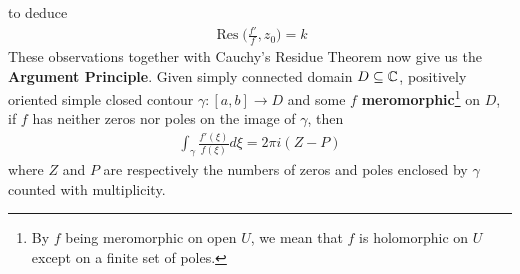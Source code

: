 \documentclass{report}
\begin{document}
to deduce 
\begin{align*}
\operatorname{Res}\Big(\frac{f'}{f},z_0 \Big)=k
\end{align*}
These observations together with Cauchy's Residue Theorem now give us the \textbf{Argument Principle}. Given simply connected domain $D\subseteq \mathbb{C}$, positively oriented simple closed contour $\gamma :[a,b]\rightarrow D$ and some $f$ \textbf{meromorphic}\footnote{By $f$ being meromorphic on open $U$, we mean that $f$ is holomorphic on $U$ except on a finite set of poles.} on $D$, if $f$ has neither zeros nor poles on the image of $\gamma $, then   
\begin{align*}
\int_{\gamma } \frac{f'(\xi)}{f(\xi)}d\xi = 2\pi  i (Z-P)
\end{align*}
where $Z$ and $P$ are respectively the numbers of zeros and poles enclosed by $\gamma $ counted with multiplicity.   \\
\end{document}
